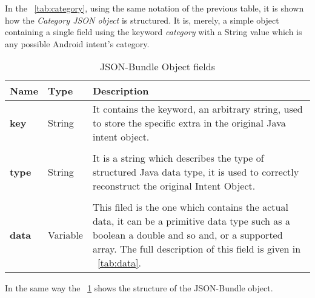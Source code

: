 In the \tablename~\ref{tab:category}, using the same notation of the previous table, it is shown how the \textit{Category JSON object} is structured. It is, merely, a simple object containing a single field using the keyword \textit{category} with a String value which is any possible Android intent's category.
\bigskip
\bigskip
\bigskip
\bigskip
\bigskip

\begin{table}[h]
	\caption{JSON-Bundle Object fields}
	\label{tab:Bundle}
	\centering
	\begin{center}
		
		\begin{tabular}{>{\centering\arraybackslash} m{}p{}p{}}
			
			\toprule
			\centering\textbf{Name} & \centering\textbf{Type}  &	\textbf{Description} \\
			\midrule
			\centering\textbf{key} & \begin{minipage}[t]{0.25\textwidth}
				\centering
				String
			\end{minipage} & \begin{minipage}[t]{0.55\textwidth}
				It contains the keyword, an arbitrary string, used to store the specific extra in the original Java intent object.
			\end{minipage}\\%
			&&\\
			\centering\textbf{type} & \begin{minipage}[t]{0.25\textwidth}
				\centering
				String
			\end{minipage} & \begin{minipage}[t]{0.55\textwidth}
				It is a string which describes the type of structured Java data type, it is used to correctly reconstruct the original Intent Object.
			\end{minipage}\\%
			&&\\
			\centering\textbf{data} & \begin{minipage}[t]{0.25\textwidth}
				\centering
				Variable
			\end{minipage} & \begin{minipage}[t]{0.55\textwidth}
				This filed is the one which contains the actual data, it can be a primitive data type such as a boolean a double and so and, or a supported array. The full description of this field is given in \tablename~\ref{tab:data}.
			\end{minipage}\\%
			\bottomrule
			
		\end{tabular}
	\end{center}
\end{table}
In the same way the \tablename~\ref{tab:Bundle} shows the structure of the JSON-Bundle object.

